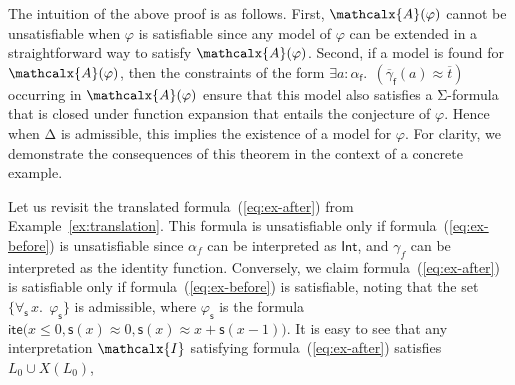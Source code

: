 \documentclass[runningheads,a4paper]{llncs}
\newcommand\DDD{\Delta}
\newcommand{\con}[1]{\mathsf{#1}}
\renewcommand\vec[1]{\overline{#1}}
\let\oldSigma=\Sigma
\def\Sigma{\mathrm{\oldSigma}}
\let\oldDelta=\Delta
\def\Delta{\mathrm{\oldDelta}}
\newcommand{\teq}{\approx}
\newcommand{\I}{\mathcalx{I}}
\newcommand{\conv}{\mathcalx{A}}
\newcommand{\typeint}{\ty{Int}}
\newcommand\ty[1]{\con{#1}}
\newcommand{\lite}{\con{ite}}
\newcommand\concret{\gamma} %
\newcommand{\forallf}[1]{\forall_{\!#1\:}}
\newcommand{\vecfarg}[1]{\vec{\concret}_{#1}}
\newcommand{\farg}[1]{\concret_{#1}}
\newcommand{\fargtype}[1]{\alpha_{#1}}
\newcommand{\rem}[1]{\textcolor{red}{[#1]}}
\newcommand{\ct}[1]{\rem{#1 --ct}}
\newcommand{\absconstraints}{X}
\begin{document}
The intuition of the above proof is as follows.
First, $\conv( \varphi )$ cannot be unsatisfiable when $\varphi$ is satisfiable
since any model of $\varphi$ can be extended in a straightforward way to satisfy $\conv( \varphi )$.
Second, if a model is found for $\conv( \varphi )$,
then the constraints of the form $\exists a : \fargtype{\con{f}}.\;\, (\vecfarg{\con{f}}( a ) \teq \vec t)$
occurring in $\conv( \varphi )$ ensure that this model also satisfies
a $\Sigma$-formula that is closed under function expansion that entails the conjecture of $\varphi$.
Hence when $\DDD$ is admissible, this implies the existence of a model for $\varphi$.
For clarity, we demonstrate the consequences of this theorem in the context of a concrete example.

\begin{example}
Let us revisit the translated formula~(\ref{eq:ex-after}) from
Example~\ref{ex:translation}. 
This formula is unsatisfiable only if
formula~(\ref{eq:ex-before}) is unsatisfiable since $\fargtype{f}$ can be
interpreted as $\typeint$, and $\farg{f}$ can be interpreted as the identity
function. Conversely, we claim formula~(\ref{eq:ex-after}) is satisfiable
only if formula~(\ref{eq:ex-before}) is satisfiable, noting that the set
$\{ \forallf{\con{s}} x.\;\, \varphi_\con{s} \}$ is admissible,
where $\varphi_\con{s}$ is the formula $\lite\bigl( x \leq 0, \con{s}(x) \teq 0, \con{s}( x ) \teq x + \con{s}( x-1 ) \bigr)$.
It is easy to see that any interpretation $\I$ satisfying formula~(\ref{eq:ex-after}) satisfies $L_0 \cup \absconstraints( L_0 )$,

\end{example}
\end{document}
